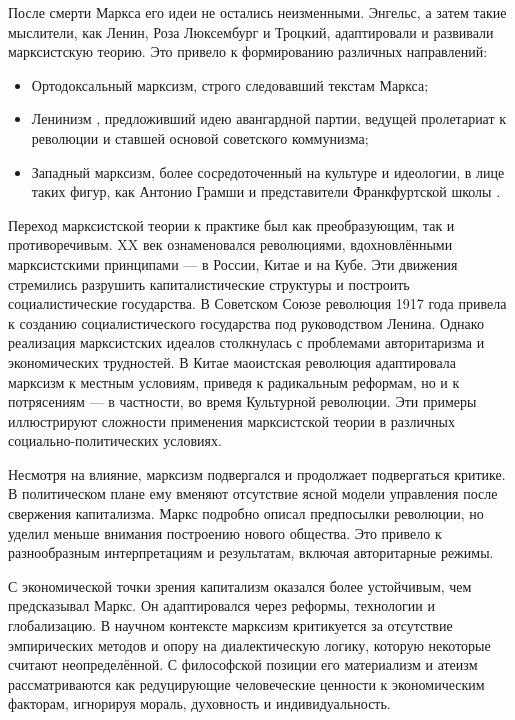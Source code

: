 \documentclass[14pt, russian]{matmex-diploma-custom}
\begin{document}
После смерти Маркса его идеи не остались неизменными. Энгельс, а затем такие мыслители, как Ленин, Роза Люксембург и Троцкий, адаптировали и развивали марксистскую теорию. Это привело к формированию различных направлений:
\begin{itemize}
    \item Ортодоксальный марксизм, строго следовавший текстам Маркса;
    \item Ленинизм \cite{lenin1902}, предложивший идею авангардной партии, ведущей пролетариат к революции и ставшей основой советского коммунизма;
    \item Западный марксизм, более сосредоточенный на культуре и идеологии, в лице таких фигур, как Антонио Грамши и представители Франкфуртской школы \cite{horkheimer1947}.
\end{itemize}

Переход марксистской теории к практике был как преобразующим, так и противоречивым. XX век ознаменовался революциями, вдохновлёнными марксистскими принципами — в России, Китае и на Кубе. Эти движения стремились разрушить капиталистические структуры и построить социалистические государства. В Советском Союзе революция 1917 года привела к созданию социалистического государства под руководством Ленина. Однако реализация марксистских идеалов столкнулась с проблемами авторитаризма и экономических трудностей. В Китае маоистская революция адаптировала марксизм к местным условиям, приведя к радикальным реформам, но и к потрясениям — в частности, во время Культурной революции. Эти примеры иллюстрируют сложности применения марксистской теории в различных социально-политических условиях.

Несмотря на влияние, марксизм подвергался и продолжает подвергаться критике. В политическом плане ему вменяют отсутствие ясной модели управления после свержения капитализма. Маркс подробно описал предпосылки революции, но уделил меньше внимания построению нового общества. Это привело к разнообразным интерпретациям и результатам, включая авторитарные режимы.

С экономической точки зрения капитализм оказался более устойчивым, чем предсказывал Маркс. Он адаптировался через реформы, технологии и глобализацию. В научном контексте марксизм критикуется за отсутствие эмпирических методов и опору на диалектическую логику, которую некоторые считают неопределённой. С философской позиции его материализм и атеизм рассматриваются как редуцирующие человеческие ценности к экономическим факторам, игнорируя мораль, духовность и индивидуальность.
\end{document}
